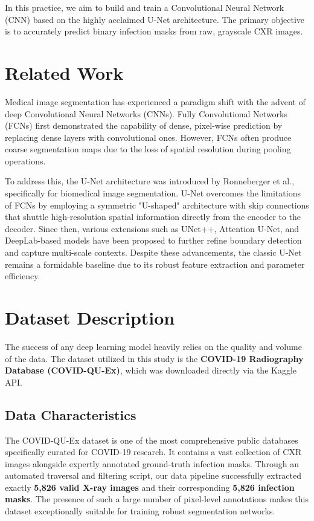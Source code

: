 \documentclass[conference]{IEEEtran}
\begin{document}
In this practice, we aim to build and train a Convolutional Neural Network (CNN) based on the highly acclaimed U-Net architecture. The primary objective is to accurately predict binary infection masks from raw, grayscale CXR images. 

\section{Related Work}
Medical image segmentation has experienced a paradigm shift with the advent of deep Convolutional Neural Networks (CNNs). Fully Convolutional Networks (FCNs) first demonstrated the capability of dense, pixel-wise prediction by replacing dense layers with convolutional ones. However, FCNs often produce coarse segmentation maps due to the loss of spatial resolution during pooling operations.

To address this, the U-Net architecture was introduced by Ronneberger et al., specifically for biomedical image segmentation. U-Net overcomes the limitations of FCNs by employing a symmetric "U-shaped" architecture with skip connections that shuttle high-resolution spatial information directly from the encoder to the decoder. Since then, various extensions such as UNet++, Attention U-Net, and DeepLab-based models have been proposed to further refine boundary detection and capture multi-scale contexts. Despite these advancements, the classic U-Net remains a formidable baseline due to its robust feature extraction and parameter efficiency.

\section{Dataset Description}
The success of any deep learning model heavily relies on the quality and volume of the data. The dataset utilized in this study is the \textbf{COVID-19 Radiography Database (COVID-QU-Ex)}, which was downloaded directly via the Kaggle API.

\subsection{Data Characteristics}
The COVID-QU-Ex dataset is one of the most comprehensive public databases specifically curated for COVID-19 research. It contains a vast collection of CXR images alongside expertly annotated ground-truth infection masks. 
Through an automated traversal and filtering script, our data pipeline successfully extracted exactly \textbf{5,826 valid X-ray images} and their corresponding \textbf{5,826 infection masks}. The presence of such a large number of pixel-level annotations makes this dataset exceptionally suitable for training robust segmentation networks.
\end{document}
